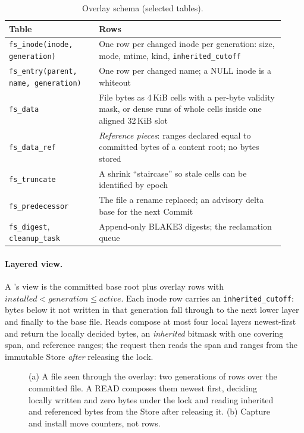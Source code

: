 \begin{table}[h]
\centering
\small
\begin{tabular}{p{0.30\linewidth} p{0.62\linewidth}}
\toprule
Table & Rows \\
\midrule
\texttt{fs\_inode(inode, generation)} & One row per changed inode per generation: size, mode, mtime, kind, \texttt{inherited\_cutoff} \\
\texttt{fs\_entry(parent, name, generation)} & One row per changed name; a NULL inode is a whiteout \\
\texttt{fs\_data} & File bytes as 4\,KiB cells with a per-byte validity mask, or dense runs of whole cells inside one aligned 32\,KiB slot \\
\texttt{fs\_data\_ref} & \emph{Reference pieces}: ranges declared equal to committed bytes of a content root; no bytes stored \\
\texttt{fs\_truncate} & A shrink ``staircase'' so stale cells can be identified by epoch \\
\texttt{fs\_predecessor} & The file a rename replaced; an advisory delta base for the next Commit \\
\texttt{fs\_digest}, \texttt{cleanup\_task} & Append-only BLAKE3 digests; the reclamation queue \\
\bottomrule
\end{tabular}
\caption{Overlay schema (selected tables).}
\label{tab:overlay}
\end{table}

\paragraph{Layered view.} A \ws{}'s view is the committed base root plus overlay rows
with $\mathit{installed} < \mathit{generation} \leq \mathit{active}$. Each inode row
carries an \texttt{inherited\_cutoff}: bytes below it not written in that generation fall
through to the next lower layer and finally to the base file. Reads compose at most four
local layers newest-first and return the locally decided bytes, an \emph{inherited}
bitmask with one covering span, and reference ranges; the request then reads the span
and ranges from the immutable Store \emph{after} releasing the \ws{} lock.

\begin{figure}[h]
\centering
\resizebox{\linewidth}{!}{}
\caption{(a) A file seen through the overlay: two generations of rows over the committed file. A READ composes them newest first, deciding locally written and zero bytes under the \ws{} lock and reading inherited and referenced bytes from the Store after releasing it. (b) Capture and install move counters, not rows.}
\label{fig:overlayview}
\end{figure}

